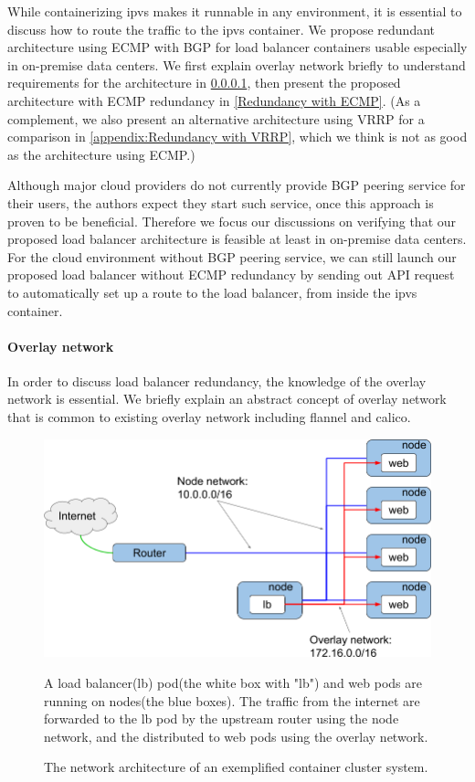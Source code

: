While containerizing ipvs makes it runnable in any environment, it is essential to discuss how to route the traffic to the ipvs container.
We propose redundant architecture using ECMP with BGP for load balancer containers usable especially in on-premise data centers.
We first explain overlay network briefly to understand requirements for the architecture in \ref{Overlay network}, then present the proposed architecture with ECMP redundancy in \ref{Redundancy with ECMP}. 
(As a complement, we also present an alternative architecture using VRRP for a comparison in \ref{appendix:Redundancy with VRRP}, which we think is not as good as the architecture using ECMP.)

Although major cloud providers do not currently provide BGP peering service for their users, the authors expect they start such service, once this approach is proven to be beneficial.
Therefore we focus our discussions on verifying that our proposed load balancer architecture is feasible at least in on-premise data centers.
For the cloud environment without BGP peering service, we can still launch our proposed load balancer without ECMP redundancy by sending out API request to automatically set up a route to the load balancer, from inside the ipvs container.

\paragraph{\bf Overlay network}\label{Overlay network}

In order to discuss load balancer redundancy, the knowledge of the overlay network is essential.
We briefly explain an abstract concept of overlay network that is common to existing overlay network including flannel\cite{coreos_2018} and calico\cite{project_calico}.

\begin{figure}[tb]
\begin{center}
\includegraphics[width=\columnwidth]{Figs/overlay.png}
\end{center}
\caption{The network architecture of an exemplified container cluster system.}
A load balancer(lb) pod(the white box with "lb") and web pods are running on nodes(the blue boxes).
  The traffic from the internet are forwarded to the lb pod by the upstream router using the node network,
  and the distributed to web pods using the overlay network.
\label{fig:overlay}
\end{figure}


